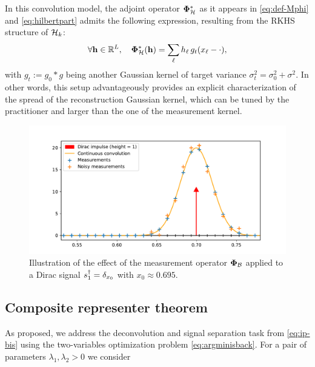 \documentclass[12pt]{article}
\begin{document}
            {
            \begin{remark}
            In this convolution model, the adjoint operator $\bm{\Phi}_\mathcal{H}^*$ as it appears in \eqref{eq:def-Mphi} and \eqref{eq:hilbertpart} admits the following expression, resulting from the RKHS structure of $\mathcal{H}_k$:
            \begin{equation}
                \label{eq:rkhs-atom}
                \forall \mathbf{h} \in \mathbb{R}^L, \quad \bm{\Phi}_\mathcal{H}^* (\mathbf{h}) = \sum_{\ell} h_\ell\, g_t(x_\ell - \cdot),
            \end{equation}
            with $g_t := g_0 * g$ being another Gaussian kernel of target variance $\sigma_t^2 = \sigma_0^2 + \sigma^2$. In other words, this setup advantageously provides an explicit characterization of the spread of the reconstruction Gaussian kernel, which can be tuned by the practitioner and larger than the one of the measurement kernel.
            \end{remark}
            }


            \begin{figure}
                \centering
                \includegraphics[width=\linewidth]{figures/simple_reco/measurement_figure.pdf}        
                \caption{Illustration of the effect of the measurement operator $\bm{\Phi}_\mathcal{B}$ applied to a Dirac signal $s_1^\dagger = \delta_{x_0}$ with $x_0 \approx 0.695$.}
                \label{fig:simple:measop}
            \end{figure}

    
    \subsection{Composite representer theorem}

        As proposed, we address the deconvolution and signal separation task from \eqref{eq:ip-bis} using the two-variables optimization problem \eqref{eq:argminisback}. For a pair of parameters $\lambda_1, \lambda_2 > 0$ we consider
\end{document}
